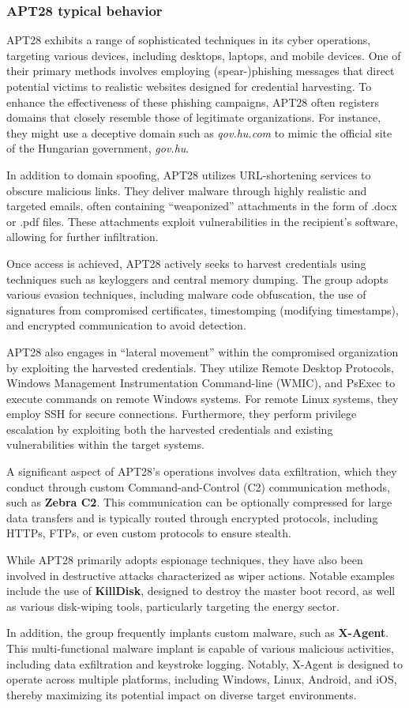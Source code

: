 \subsubsection{APT28 typical behavior}


APT28 exhibits a range of sophisticated techniques in its cyber
operations, targeting various devices, including desktops, laptops,
and mobile devices. One of their primary methods involves employing
(spear-)phishing messages that direct potential victims to realistic
websites designed for credential harvesting. To enhance the
effectiveness of these phishing campaigns, APT28 often registers
domains that closely resemble those of legitimate organizations. For
instance, they might use a deceptive domain such as
\textit{qov.hu.com} to mimic the official site of the Hungarian
government, \textit{gov.hu}.

In addition to domain spoofing, APT28 utilizes URL-shortening services
to obscure malicious links. They deliver malware through highly
realistic and targeted emails, often containing “weaponized”
attachments in the form of .docx or .pdf files. These attachments
exploit vulnerabilities in the recipient’s software, allowing for
further infiltration.

Once access is achieved, APT28 actively seeks to harvest credentials
using techniques such as keyloggers and central memory dumping. The
group adopts various evasion techniques, including malware code
obfuscation, the use of signatures from compromised certificates,
timestomping (modifying timestamps), and encrypted communication to
avoid detection.

APT28 also engages in “lateral movement” within the compromised
organization by exploiting the harvested credentials. They utilize
Remote Desktop Protocols, Windows Management Instrumentation
Command-line (WMIC), and PsExec to execute commands on remote Windows
systems. For remote Linux systems, they employ SSH for secure
connections. Furthermore, they perform privilege escalation by
exploiting both the harvested credentials and existing vulnerabilities
within the target systems.

A significant aspect of APT28's operations involves data exfiltration,
which they conduct through custom Command-and-Control (C2)
communication methods, such as \textbf{Zebra C2}. This communication
can be optionally compressed for large data transfers and is typically
routed through encrypted protocols, including HTTPs, FTPs, or even
custom protocols to ensure stealth.

While APT28 primarily adopts espionage techniques, they have also been
involved in destructive attacks characterized as wiper actions.
Notable examples include the use of \textbf{KillDisk}, designed to
destroy the master boot record, as well as various disk-wiping tools,
particularly targeting the energy sector.

In addition, the group frequently implants custom malware, such as
\textbf{X-Agent}. This multi-functional malware implant is capable of
various malicious activities, including data exfiltration and
keystroke logging. Notably, X-Agent is designed to operate across
multiple platforms, including Windows, Linux, Android, and iOS,
thereby maximizing its potential impact on diverse target
environments.
